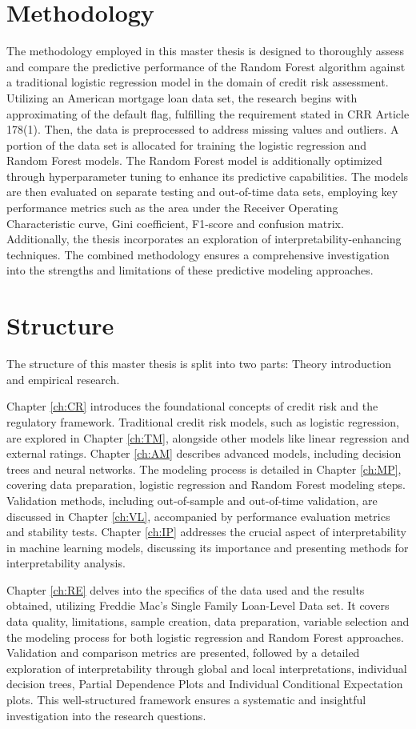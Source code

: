 \section{Methodology}

The methodology employed in this master thesis is designed to thoroughly assess and compare the predictive performance of the Random Forest algorithm against a traditional logistic regression model in the domain of credit risk assessment. Utilizing an American mortgage loan data set, the research begins with approximating of the default flag, fulfilling the requirement stated in \ac{CRR} Article 178(1). Then, the data is preprocessed to address missing values and outliers. A portion of the data set is allocated for training the logistic regression and Random Forest models. The Random Forest model is additionally optimized through hyperparameter tuning to enhance its predictive capabilities. The models are then evaluated on separate testing and out-of-time data sets, employing key performance metrics such as the area under the Receiver Operating Characteristic curve, Gini coefficient, F1-score and confusion matrix. Additionally, the thesis incorporates an exploration of interpretability-enhancing techniques. The combined methodology ensures a comprehensive investigation into the strengths and limitations of these predictive modeling approaches.

\section{Structure}

The structure of this master thesis is split into two parts: Theory introduction and empirical research. 

Chapter \ref{ch:CR} introduces the foundational concepts of credit risk and the regulatory framework. Traditional credit risk models, such as logistic regression, are explored in Chapter \ref{ch:TM}, alongside other models like linear regression and external ratings. Chapter \ref{ch:AM} describes advanced models, including decision trees and neural networks. The modeling process is detailed in Chapter \ref{ch:MP}, covering data preparation, logistic regression and Random Forest modeling steps. Validation methods, including out-of-sample and out-of-time validation, are discussed in Chapter \ref{ch:VL}, accompanied by performance evaluation metrics and stability tests. Chapter \ref{ch:IP} addresses the crucial aspect of interpretability in machine learning models, discussing its importance and presenting methods for interpretability analysis. 

Chapter \ref{ch:RE} delves into the specifics of the data used and the results obtained, utilizing Freddie Mac's Single Family Loan-Level Data set. It covers data quality, limitations, sample creation, data preparation, variable selection and the modeling process for both logistic regression and Random Forest approaches. Validation and comparison metrics are presented, followed by a detailed exploration of interpretability through global and local interpretations, individual decision trees, Partial Dependence Plots and Individual Conditional Expectation plots. 
This well-structured framework ensures a systematic and insightful investigation into the research questions.